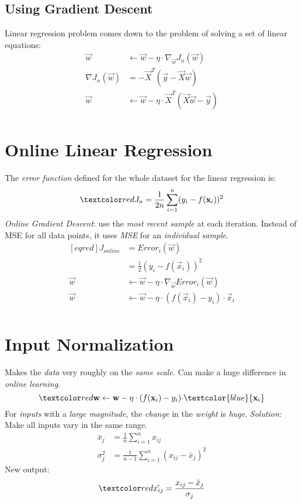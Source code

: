 \documentclass[
	exam={Midterm}
]{cs584exam}
\begin{document}
\subsection{Using Gradient Descent}\label{subsec:using-gradient-descent}
Linear regression problem comes down to the problem of solving a set of linear equations:
\begin{equation*}
\begin{aligned}
	\vec{w} &\gets \vec{w} - \eta\cdot\nabla_{\vec{w}} J_{n}(\vec{w})\\
	\nabla J_{n}(\vec{w}) &= -\vec{X}^{T}(\vec{y} - \vec{X}\vec{w})\\
	\vec{w} &\gets \vec{w} - \eta\cdot\vec{X}^{T}(\vec{X}\vec{w} - \vec{y})\\
\end{aligned}
\end{equation*}

\section{Online Linear Regression}\label{sec:online-linear-regression}
The \emph{error function} defined for the whole dataset for the linear regression is:
\[ \data{ J_{n} = \frac{1}{2n}\sum_{i=1}^{n} (y_{i} - f(\vec{x}_{i}))^{2} } \]
\emph{Online Gradient Descent}: use the \emph{most recent sample} at each iteration.
Instead of MSE for all data points, it uses \emph{MSE} for an \emph{individual sample}.
\begin{equation*}
\begin{aligned}[eqred]
	J_{online} &= Error_{i}(\vec{w})\\
	&= \frac{1}{2} \left( y_{i} - f(\vec{x}_{i}) \right)^{2}\\
	\vec{w} &\gets \vec{w} - \eta \cdot \nabla_{\vec{w}} Error_{i}(\vec{w})\\
	\vec{w} &\gets \vec{w} - \eta \cdot (f(\vec{x}_{i}) - y_{i}) \cdot \vec{x}_{i}\\
\end{aligned}
\end{equation*}

\section{Input Normalization}\label{sec:input-normalization}
Makes the \emph{data} very roughly on the \emph{same scale}.
Can make a huge difference in \emph{online learning}.
\[ \data{ \vec{w} \gets \vec{w} - \eta \cdot (f(\vec{x}_{i}) - y_{i}) \cdot } \textcolor{blue}{\vec{x}_{i}} \]
For \emph{inputs} with a \emph{large magnitude}, the \emph{change} in the \emph{weight} is \emph{huge}.
\emph{Solution}: Make all inputs vary in the same range.
\begin{equation}
	\begin{aligned}
		\bar{x}_{j} &= \frac{1}{n}\sum_{i=1}^{n} x_{ij}\\
		\sigma_{j}^{2} &= \frac{1}{n-1} \sum_{i=1}^{n} (x_{ij} - \bar{x}_{j})^{2}
	\end{aligned}
	\label{eq:normalization}
\end{equation}
New output:
\[ \data{ \tildehat{x_{ij}} = \frac{x_{ij} - \bar{x}_{j}}{\sigma_{j}} } \]
\end{document}

